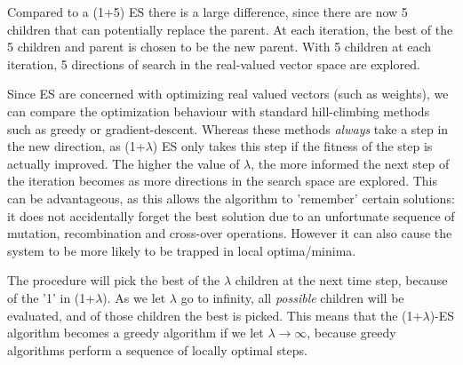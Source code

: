 \documentclass{article}
\begin{document}
Compared to a (1+5) ES there is a large difference, since there are now 5 children that can potentially replace the parent. At each iteration, the best of the 5 children and parent is chosen to be the new parent. With 5 children at each iteration, 5 directions of search in the real-valued vector space are explored.

Since ES are concerned with optimizing real valued vectors (such as weights), we can compare the optimization behaviour with standard hill-climbing methods such as greedy or gradient-descent. Whereas these methods \textit{always} take a step in the new direction, as (1+$\lambda$) ES only takes this step if the fitness of the step is actually improved. The higher the value of $\lambda$, the more informed the next step of the iteration becomes as more directions in the search space are explored. This can be advantageous, as this allows the algorithm to 'remember' certain solutions: it does not accidentally forget the best solution due to an unfortunate sequence of mutation, recombination and cross-over operations. However it can also cause the system to be more likely to be trapped in local optima/minima. 

The procedure will pick the best of the $\lambda$ children at the next time step, because of the '1' in (1+$\lambda$). As we let $\lambda$ go to infinity, all \textit{possible} children will be evaluated, and of those children the best is picked. This means that the (1+$\lambda$)-ES algorithm becomes a greedy algorithm if we let $\lambda \to \infty$, because greedy algorithms perform a sequence of locally optimal steps. 


\end{document}
